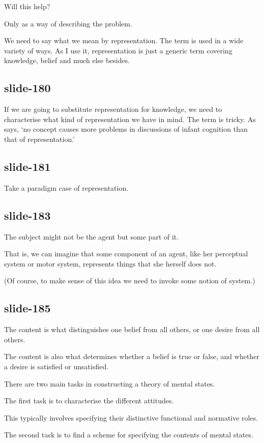 \documentclass[12pt,\papersize]{extarticle}
\begin{document}
Will this help?
 
Only as a way of describing the problem.
 
We need to say what we mean by representation.
The term is used in a wide variety of ways.
As I use it, representation is just a generic term covering knowledge, belief and much else besides.
 
\subsection{slide-180}
If we are going to substitute representation for knowledge, 
we need to characterise what kind of representation we have in mind.
The term is tricky.
As \citet{Haith:1998aq} says, ‘no concept causes more problems in discussions of infant cognition than that of representation.’
 
\subsection{slide-181}
Take a paradigm case of representation.
 
\subsection{slide-183}
The subject might not be the agent but some part of it.
 
That is, we can imagine that some component of an agent, like her perceptual system or motor system, represents things that she herself does not.
 
(Of course, to make sense of this idea we need to invoke some notion of system.)
 
\subsection{slide-185}
The content is what distinguishes one belief from all others, or one desire from all others.
 
The content is also what determines whether a belief is true or false, and whether a desire is satisfied or unsatisfied.
 
There are two main tasks in constructing a theory of mental states.
 
The first task is to characterise the different attitudes.
 
This typically involves specifying their distinctive functional and normative roles.
 
The second task is to find a scheme for specifying the contents of mental states.
 
\end{document}
